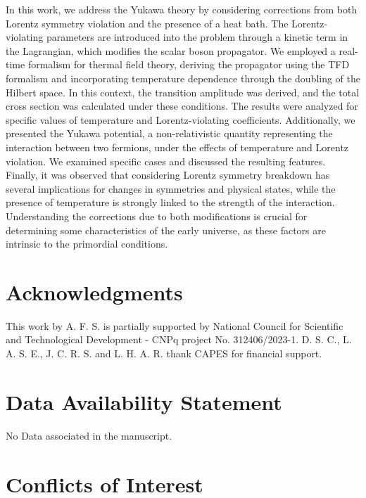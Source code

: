 \documentclass[11pt,showpacs,preprintnumbers,amsmath,amssymb,prd,nofootinbib,superscriptaddress]{revtex4-2}
\begin{document}
In this work, we address the Yukawa theory by considering corrections from both Lorentz symmetry violation and the presence of a heat bath. The Lorentz-violating parameters are introduced into the problem through a kinetic term in the Lagrangian, which modifies the scalar boson propagator. We employed a real-time formalism for thermal field theory, deriving the propagator using the TFD formalism and incorporating temperature dependence through the doubling of the Hilbert space. In this context, the transition amplitude was derived, and the total cross section was calculated under these conditions. The results were analyzed for specific values of temperature and Lorentz-violating coefficients. Additionally, we presented the Yukawa potential, a non-relativistic quantity representing the interaction between two fermions, under the effects of temperature and Lorentz violation. We examined specific cases and discussed the resulting features. Finally, it was observed that considering Lorentz symmetry breakdown has several implications for changes in symmetries and physical states, while the presence of temperature is strongly linked to the strength of the interaction. Understanding the corrections due to both modifications is crucial for determining some characteristics of the early universe, as these factors are intrinsic to the primordial conditions.

\section*{Acknowledgments}

This work by A. F. S. is partially supported by National Council for Scientific and Technological
Development - CNPq project No. 312406/2023-1. D. S. C., L. A. S. E., J. C. R. S. and L. H. A. R. thank CAPES for financial support.


\section*{Data Availability Statement}

No Data associated in the manuscript.

\section*{Conflicts of Interest}
\end{document}
